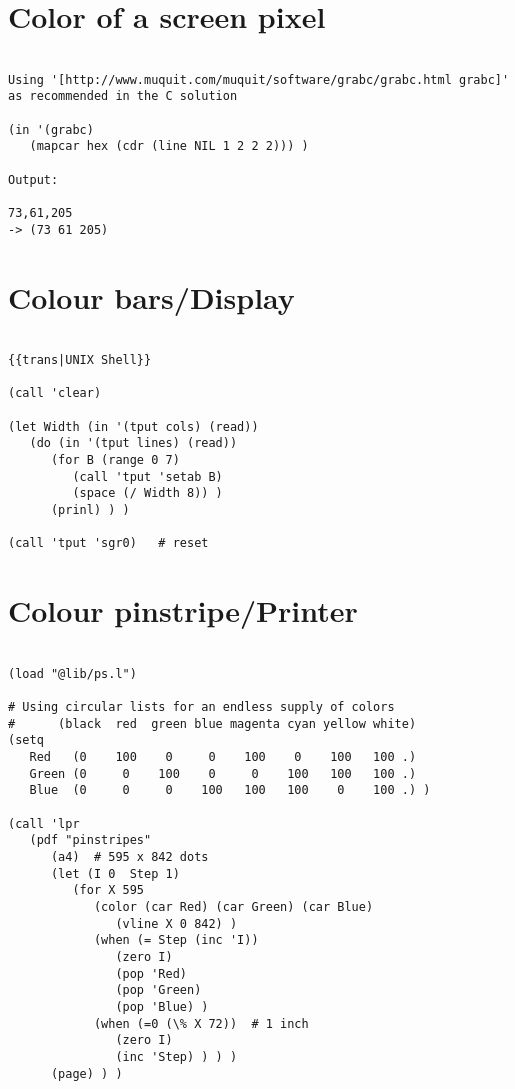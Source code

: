 \section*{Color of a screen pixel}

\begin{verbatim}

Using '[http://www.muquit.com/muquit/software/grabc/grabc.html grabc]'
as recommended in the C solution

(in '(grabc)
   (mapcar hex (cdr (line NIL 1 2 2 2))) )

Output:

73,61,205
-> (73 61 205)

\end{verbatim}

\section*{Colour bars/Display}

\begin{verbatim}

{{trans|UNIX Shell}}

(call 'clear)

(let Width (in '(tput cols) (read))
   (do (in '(tput lines) (read))
      (for B (range 0 7)
         (call 'tput 'setab B)
         (space (/ Width 8)) )
      (prinl) ) )

(call 'tput 'sgr0)   # reset

\end{verbatim}

\section*{Colour pinstripe/Printer}

\begin{verbatim}

(load "@lib/ps.l")

# Using circular lists for an endless supply of colors
#      (black  red  green blue magenta cyan yellow white)
(setq
   Red   (0    100    0     0    100    0    100   100 .)
   Green (0     0    100    0     0    100   100   100 .)
   Blue  (0     0     0    100   100   100    0    100 .) )

(call 'lpr
   (pdf "pinstripes"
      (a4)  # 595 x 842 dots
      (let (I 0  Step 1)
         (for X 595
            (color (car Red) (car Green) (car Blue)
               (vline X 0 842) )
            (when (= Step (inc 'I))
               (zero I)
               (pop 'Red)
               (pop 'Green)
               (pop 'Blue) )
            (when (=0 (\% X 72))  # 1 inch
               (zero I)
               (inc 'Step) ) ) )
      (page) ) )

\end{verbatim}

